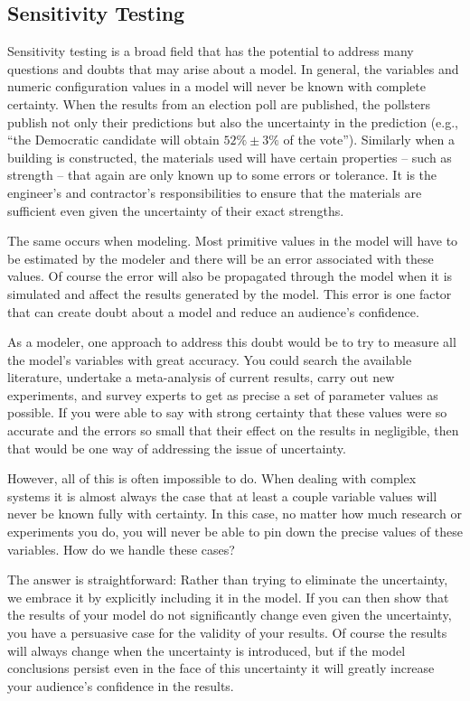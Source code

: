 \documentclass[]{memoir}
\begin{document}
\subsection{Sensitivity Testing}

Sensitivity testing is a broad field that has the potential to address
many questions and doubts that may arise about a model. In general, the
variables and numeric configuration values in a model will never be
known with complete certainty. When the results from an election poll
are published, the pollsters publish not only their predictions but also
the uncertainty in the prediction (e.g., ``the Democratic candidate will
obtain $52\% \pm 3\%$ of the vote''). Similarly when a building is
constructed, the materials used will have certain properties -- such as
strength -- that again are only known up to some errors or tolerance. It
is the engineer's and contractor's responsibilities to ensure that the
materials are sufficient even given the uncertainty of their exact
strengths.

The same occurs when modeling. Most primitive values in the model will
have to be estimated by the modeler and there will be an error
associated with these values. Of course the error will also be
propagated through the model when it is simulated and affect the results
generated by the model. This error is one factor that can create doubt
about a model and reduce an audience's confidence.

As a modeler, one approach to address this doubt would be to try to
measure all the model's variables with great accuracy. You could search
the available literature, undertake a meta-analysis of current results,
carry out new experiments, and survey experts to get as precise a set of
parameter values as possible. If you were able to say with strong
certainty that these values were so accurate and the errors so small
that their effect on the results in negligible, then that would be one
way of addressing the issue of uncertainty.

However, all of this is often impossible to do. When dealing with
complex systems it is almost always the case that at least a couple
variable values will never be known fully with certainty. In this case,
no matter how much research or experiments you do, you will never be
able to pin down the precise values of these variables. How do we handle
these cases?

The answer is straightforward: Rather than trying to eliminate the
uncertainty, we embrace it by explicitly including it in the model. If
you can then show that the results of your model do not significantly
change even given the uncertainty, you have a persuasive case for the
validity of your results. Of course the results will always change when
the uncertainty is introduced, but if the model conclusions persist even
in the face of this uncertainty it will greatly increase your audience's
confidence in the results.
\end{document}
